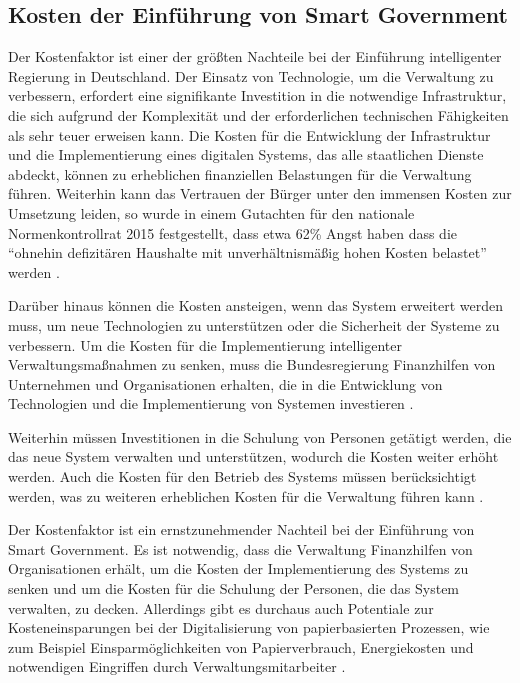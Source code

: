 \subsection{Kosten der Einführung von Smart Government}
Der Kostenfaktor ist einer der größten Nachteile bei der Einführung intelligenter Regierung in Deutschland.
Der Einsatz von Technologie, um die Verwaltung zu verbessern, erfordert eine signifikante Investition in die notwendige Infrastruktur, die sich aufgrund der Komplexität und der erforderlichen technischen Fähigkeiten als sehr teuer erweisen kann.
Die Kosten für die Entwicklung der Infrastruktur und die Implementierung eines digitalen Systems, das alle staatlichen Dienste abdeckt, können zu erheblichen finanziellen Belastungen für die Verwaltung führen.
Weiterhin kann das Vertrauen der Bürger unter den immensen Kosten zur Umsetzung leiden, so wurde in einem Gutachten für den nationale Normenkontrollrat 2015 festgestellt, dass etwa 62\% Angst haben dass die ``ohnehin defizitären Haushalte mit unverhältnismäßig hohen Kosten belastet'' werden \citep[][S. 16]{NationalenNormenkontrollrat2015}.
\par
Darüber hinaus können die Kosten ansteigen, wenn das System erweitert werden muss, um neue Technologien zu unterstützen oder die Sicherheit der Systeme zu verbessern.
Um die Kosten für die Implementierung intelligenter Verwaltungsmaßnahmen zu senken, muss die Bundesregierung Finanzhilfen von Unternehmen und Organisationen erhalten, die in die Entwicklung von Technologien und die Implementierung von Systemen investieren \citep[][S. 51]{NationalenNormenkontrollrat2015}.
\par
Weiterhin müssen Investitionen in die Schulung von Personen getätigt werden, die das neue System verwalten und unterstützen, wodurch die Kosten weiter erhöht werden.
Auch die Kosten für den Betrieb des Systems müssen berücksichtigt werden, was zu weiteren erheblichen Kosten für die Verwaltung führen kann \citep[][S. 52, 88]{NationalenNormenkontrollrat2015}.
\par
Der Kostenfaktor ist ein ernstzunehmender Nachteil bei der Einführung von Smart Government.
Es ist notwendig, dass die Verwaltung Finanzhilfen von Organisationen erhält, um die Kosten der Implementierung des Systems zu senken und um die Kosten für die Schulung der Personen, die das System verwalten, zu decken.
Allerdings gibt es durchaus auch Potentiale zur Kosteneinsparungen bei der Digitalisierung von papierbasierten Prozessen, wie zum Beispiel Einsparmöglichkeiten von Papierverbrauch, Energiekosten und notwendigen Eingriffen durch Verwaltungsmitarbeiter \citep[Vgl.][S.179]{von_Lucke_2016}.
